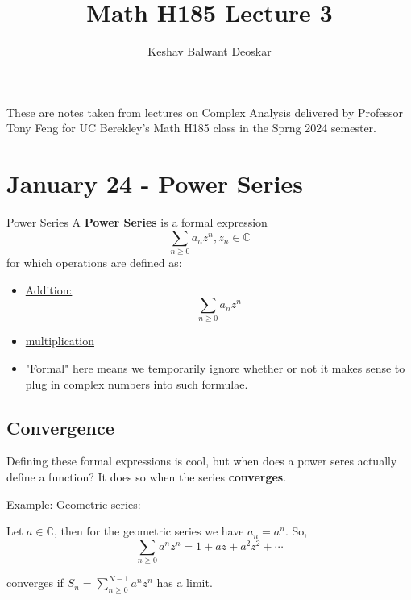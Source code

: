 \documentclass{article}
\title{Math H185 Lecture 3}
\author{Keshav Balwant Deoskar}
\newcommand{\C}{\mathbb{C}}
\begin{document}
\maketitle

These are notes taken from lectures on Complex Analysis delivered by Professor Tony Feng for UC Berekley's Math H185 class in the Sprng 2024 semester.

\tableofcontents

\pagebreak

\section{January 24 - Power Series}

\vskip 1cm
\begin{mathdefinitionbox}{Power Series}
  A \textbf{Power Series} is a formal expression
  \[ \sum_{n \geq 0} a_n z^{n}, z_n \in \C \]
  for which operations are defined as:

  \begin{itemize}
    \item \underline{Addition:} 
    \[  \sum_{n \geq 0} a_n z^{n} \]
    \item \underline{multiplication}
  \end{itemize}
\end{mathdefinitionbox}

\begin{itemize}
  \item "Formal" here means we temporarily ignore whether or not it makes sense to plug in complex numbers into such formulae.
\end{itemize}

\vskip 1cm
\subsection{Convergence}
Defining these formal expressions is cool, but when does a power seres actually define a function? It does so when the series \textbf{converges}.

\vskip 0.5cm
\underline{Example:} Geometric series:

Let $a \in \C$, then for the geometric series we have $a_n = a^n$. So, 
\[ \sum_{n \geq 0} a^n z^n = 1 + az +  a^2z^2 + \cdots \]

converges if $S_n = \sum_{n \geq 0}^{N-1} a^n z^n$ has a limit.
\end{document}
